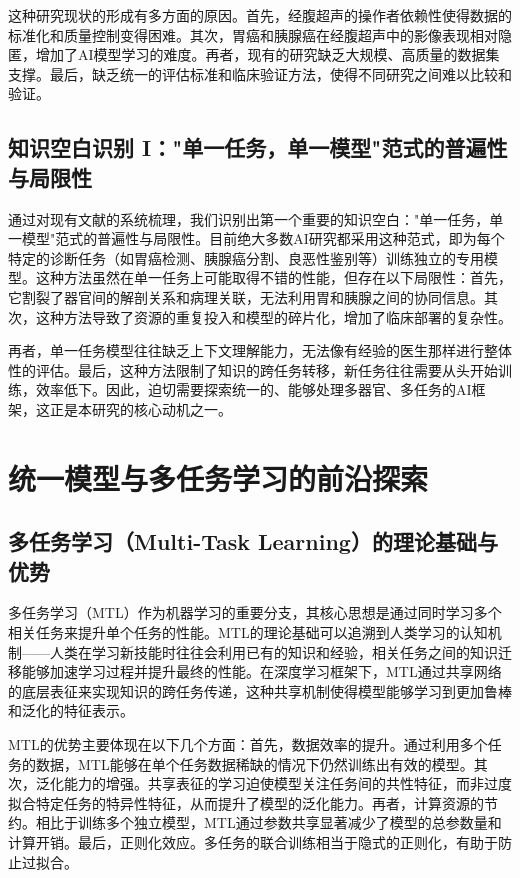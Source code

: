 这种研究现状的形成有多方面的原因。首先，经腹超声的操作者依赖性使得数据的标准化和质量控制变得困难。其次，胃癌和胰腺癌在经腹超声中的影像表现相对隐匿，增加了AI模型学习的难度。再者，现有的研究缺乏大规模、高质量的数据集支撑。最后，缺乏统一的评估标准和临床验证方法，使得不同研究之间难以比较和验证。

\subsection{知识空白识别 I："单一任务，单一模型"范式的普遍性与局限性}

通过对现有文献的系统梳理，我们识别出第一个重要的知识空白："单一任务，单一模型"范式的普遍性与局限性。目前绝大多数AI研究都采用这种范式，即为每个特定的诊断任务（如胃癌检测、胰腺癌分割、良恶性鉴别等）训练独立的专用模型。这种方法虽然在单一任务上可能取得不错的性能，但存在以下局限性：首先，它割裂了器官间的解剖关系和病理关联，无法利用胃和胰腺之间的协同信息。其次，这种方法导致了资源的重复投入和模型的碎片化，增加了临床部署的复杂性。

再者，单一任务模型往往缺乏上下文理解能力，无法像有经验的医生那样进行整体性的评估。最后，这种方法限制了知识的跨任务转移，新任务往往需要从头开始训练，效率低下。因此，迫切需要探索统一的、能够处理多器官、多任务的AI框架，这正是本研究的核心动机之一。

\section{统一模型与多任务学习的前沿探索}

\subsection{多任务学习（Multi-Task Learning）的理论基础与优势}

多任务学习（MTL）作为机器学习的重要分支，其核心思想是通过同时学习多个相关任务来提升单个任务的性能。MTL的理论基础可以追溯到人类学习的认知机制——人类在学习新技能时往往会利用已有的知识和经验，相关任务之间的知识迁移能够加速学习过程并提升最终的性能。在深度学习框架下，MTL通过共享网络的底层表征来实现知识的跨任务传递，这种共享机制使得模型能够学习到更加鲁棒和泛化的特征表示。

MTL的优势主要体现在以下几个方面：首先，数据效率的提升。通过利用多个任务的数据，MTL能够在单个任务数据稀缺的情况下仍然训练出有效的模型。其次，泛化能力的增强。共享表征的学习迫使模型关注任务间的共性特征，而非过度拟合特定任务的特异性特征，从而提升了模型的泛化能力。再者，计算资源的节约。相比于训练多个独立模型，MTL通过参数共享显著减少了模型的总参数量和计算开销。最后，正则化效应。多任务的联合训练相当于隐式的正则化，有助于防止过拟合。

